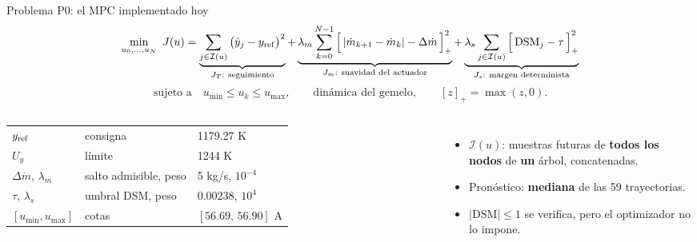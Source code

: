 \documentclass[aspectratio=169,10pt]{beamer}
\newcommand{\key}[1]{{\color{USMBlue}\bfseries #1}}
\newcommand{\yhat}{\hat y}
\begin{document}
\begin{frame}{Problema P0: el MPC implementado hoy}
\vspace{-.1cm}
{\small
\[
\min_{u_0,\dots,u_N}\ J(u)=
\underbrace{\sum_{j\in\mathcal I(u)}\big(\yhat_j-y_{\rm ref}\big)^2}_{J_T:\ \text{seguimiento}}
+\underbrace{\lambda_m\sum_{k=0}^{N-1}\Big[\,|\dot m_{k+1}-\dot m_k|-\Delta\dot m\,\Big]_+^2}_{J_m:\ \text{suavidad del actuador}}
+\underbrace{\lambda_s\sum_{j\in\mathcal I(u)}\Big[\,\mathrm{DSM}_j-\tau\,\Big]_+^2}_{J_s:\ \text{margen determinista}}
\]
\vspace{-.15cm}
\[
\text{sujeto a}\quad u_{\min}\leq u_k\leq u_{\max},\qquad \text{dinámica del gemelo},\qquad [z]_+=\max(z,0).
\]}
\begin{columns}[T]
\small
\begin{tabular}{@{}lll@{}}
\toprule
$y_{\rm ref}$ & consigna & 1179.27 K\\
$U_y$ & límite & 1244 K\\
$\Delta\dot m$, $\lambda_m$ & salto admisible, peso & 5 kg/s, $10^{-4}$\\
$\tau$, $\lambda_s$ & umbral DSM, peso & 0.00238, $10^{4}$\\
$[u_{\min},u_{\max}]$ & cotas & $[56.69,\,56.90]$ A\\
\bottomrule
\end{tabular}
\begin{itemize}\setlength{\itemsep}{.1cm}\small
\item $\mathcal I(u)$: muestras futuras de \key{todos los nodos} de \key{un} árbol, concatenadas.
\item Pronóstico: \key{mediana} de las 59 trayectorias.
\item $|\mathrm{DSM}|\leq 1$ se verifica, pero el optimizador no lo impone.
\end{itemize}
\end{columns}
\end{frame}
\end{document}
